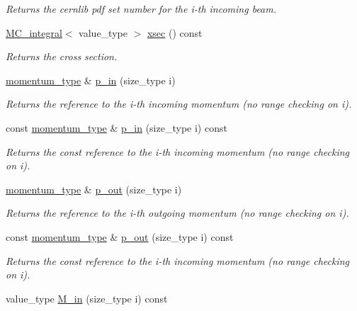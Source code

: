 \begin{DoxyCompactItemize}
\begin{DoxyCompactList}\small\item\em Returns the cernlib pdf set number for the i-\/th incoming beam. \end{DoxyCompactList}\item 
\hypertarget{a00441_a2ae209b5513c286010117df72fbd52f6}{\hyperlink{a00363}{M\-C\-\_\-integral}$<$ value\-\_\-type $>$ \hyperlink{a00441_a2ae209b5513c286010117df72fbd52f6}{xsec} () const }\label{a00441_a2ae209b5513c286010117df72fbd52f6}

\begin{DoxyCompactList}\small\item\em Returns the cross section. \end{DoxyCompactList}\item 
\hyperlink{a00559}{momentum\-\_\-type} \& \hyperlink{a00441_a088d3c3937abd672371420b0001a44f3}{p\-\_\-in} (size\-\_\-type i)
\begin{DoxyCompactList}\small\item\em Returns the reference to the i-\/th incoming momentum (no range checking on i). \end{DoxyCompactList}\item 
const \hyperlink{a00559}{momentum\-\_\-type} \& \hyperlink{a00441_a8a5e9271352f7631ce0652c22634cbfe}{p\-\_\-in} (size\-\_\-type i) const 
\begin{DoxyCompactList}\small\item\em Returns the const reference to the i-\/th incoming momentum (no range checking on i). \end{DoxyCompactList}\item 
\hyperlink{a00559}{momentum\-\_\-type} \& \hyperlink{a00441_abf9dd4563f40b5e2912e085b9b9b5f48}{p\-\_\-out} (size\-\_\-type i)
\begin{DoxyCompactList}\small\item\em Returns the reference to the i-\/th outgoing momentum (no range checking on i). \end{DoxyCompactList}\item 
const \hyperlink{a00559}{momentum\-\_\-type} \& \hyperlink{a00441_a13237d14de63e18b80517e1b1c88e7cb}{p\-\_\-out} (size\-\_\-type i) const 
\begin{DoxyCompactList}\small\item\em Returns the const reference to the i-\/th incoming momentum (no range checking on i). \end{DoxyCompactList}\item 
\hypertarget{a00441_af9293b92caee4fa9035e89dcfbbbcae5}{value\-\_\-type \hyperlink{a00441_af9293b92caee4fa9035e89dcfbbbcae5}{M\-\_\-in} (size\-\_\-type i) const }\label{a00441_af9293b92caee4fa9035e89dcfbbbcae5}


\end{DoxyCompactItemize}
